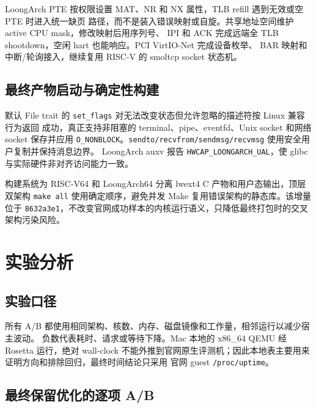 \documentclass[UTF8,zihao=-4]{ctexart}
\newcommand{\code}{\nolinkurl}
\begin{document}
LoongArch PTE 按权限设置 MAT、NR 和 NX 属性，TLB refill 遇到无效或空 PTE 时进入统一缺页
路径，而不是装入错误映射或自旋。共享地址空间维护 active CPU mask，修改映射后用序列号、
IPI 和 ACK 完成远端全 TLB shootdown，空闲 hart 也能响应。PCI VirtIO-Net 完成设备枚举、
BAR 映射和中断/轮询接入，继续复用 RISC-V 的 smoltcp socket 状态机。

\subsection{最终产物启动与确定性构建}

默认 File trait 的 \code{set_flags} 对无法改变状态但允许忽略的描述符按 Linux 兼容行为返回
成功，真正支持非阻塞的 terminal、pipe、eventfd、Unix socket 和网络 socket 保存并应用
\code{O_NONBLOCK}。\code{sendto/recvfrom/sendmsg/recvmsg} 使用安全用户复制并保持消息边界。
LoongArch auxv 报告 \code{HWCAP_LOONGARCH_UAL}，使 glibc 与实际硬件非对齐访问能力一致。

构建系统为 RISC-V64 和 LoongArch64 分离 lwext4 C 产物和用户态输出，顶层双架构
\code{make all} 使用确定顺序，避免并发 Make 复用错误架构的静态库。该增量位于
\code{8632a3e1}，不改变官网成功样本的内核运行语义，只降低最终打包时的交叉架构污染风险。

\section{实验分析}
\label{sec:experiments}

\subsection{实验口径}

所有 A/B 都使用相同架构、核数、内存、磁盘镜像和工作量，相邻运行以减少宿主波动。
负数代表耗时、请求或等待下降。Mac 本地的 x86\_64 QEMU 经 Rosetta 运行，绝对 wall-clock
不能外推到官网原生评测机；因此本地表主要用来证明方向和排除回归，最终时间结论只采用
官网 guest \code{/proc/uptime}。

\subsection{最终保留优化的逐项 A/B}
\end{document}
